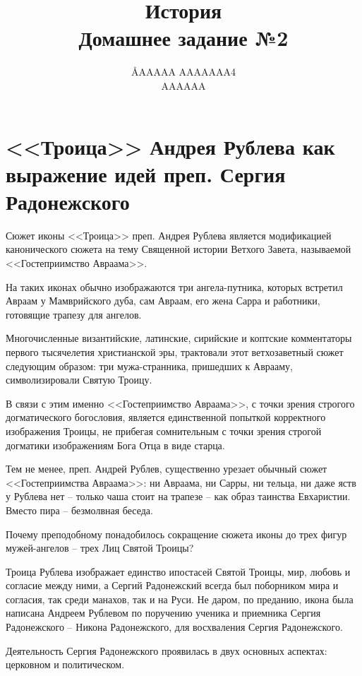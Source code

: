 \documentclass[12pt]{article}
\title{История \\ Домашнее задание №2}
\author{\AA{AAAAA AAAAAAA}{4} \\ AAAAAA}
\begin{document}
  \maketitle

  \setcounter{section}{2}
  \section{<<Троица>> Андрея Рублева как выражение идей преп. Сергия Радонежского}
  Сюжет иконы <<Троица>> преп. Андрея Рублева является модификацией канонического сюжета на тему Священной истории Ветхого Завета,
  называемой <<Гостеприимство Авраама>>.

  На таких иконах обычно изображаются три ангела-путника,
  которых встретил Авраам у Мамврийского дуба, сам Авраам, его жена Сарра
  и работники, готовящие трапезу для ангелов.

  Многочисленные византийские, латинские, сирийские и коптские комментаторы первого тысячелетия христианской эры,
  трактовали этот ветхозаветный сюжет следующим образом:
  три мужа-странника, пришедших к Аврааму, символизировали Святую Троицу.

  В связи с этим именно <<Гостеприимство Авраама>>, с точки зрения строгого догматического богословия,
  является единственной попыткой корректного изображения Троицы,
  не прибегая сомнительным с точки зрения строгой догматики изображениям Бога Отца в виде старца.

  Тем не менее, преп. Андрей Рублев, существенно урезает обычный сюжет <<Гостеприимства Авраама>>:
  ни Авраама, ни Сарры, ни тельца, ни даже яств у Рублева нет -- только чаша стоит на трапезе -- как образ таинства Евхаристии.
  Вместо пира -- безмолвная беседа.

  Почему преподобному понадобилось сокращение сюжета иконы до трех фигур мужей-ангелов -- трех Лиц Святой Троицы?

  Троица Рублева изображает единство ипостасей Святой Троицы, мир, любовь и согласие между ними,
  а Сергий Радонежский всегда был поборником мира и согласия, так среди манахов, так и на Руси.
  Не даром, по преданию, икона была написана Андреем Рублевом по поручению ученика и приемника Сергия Радонежского -- Никона Радонежского,
  для восхваления Сергия Радонежского.

  Деятельность Сергия Радонежского проявилась в двух основных аспектах: церковном и политическом.
\end{document}
